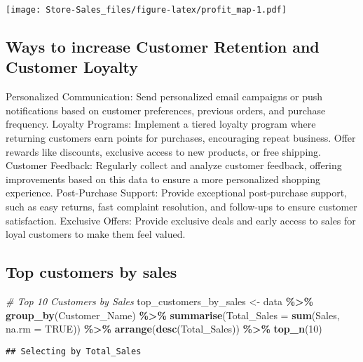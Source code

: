 \documentclass[
]{article}
\newenvironment{Shaded}{\begin{snugshade}}{\end{snugshade}}
\newcommand{\AttributeTok}[1]{\textcolor[rgb]{0.13,0.29,0.53}{#1}}
\newcommand{\CommentTok}[1]{\textcolor[rgb]{0.56,0.35,0.01}{\textit{#1}}}
\newcommand{\ConstantTok}[1]{\textcolor[rgb]{0.56,0.35,0.01}{#1}}
\newcommand{\DecValTok}[1]{\textcolor[rgb]{0.00,0.00,0.81}{#1}}
\newcommand{\FunctionTok}[1]{\textcolor[rgb]{0.13,0.29,0.53}{\textbf{#1}}}
\newcommand{\NormalTok}[1]{#1}
\newcommand{\OtherTok}[1]{\textcolor[rgb]{0.56,0.35,0.01}{#1}}
\newcommand{\SpecialCharTok}[1]{\textcolor[rgb]{0.81,0.36,0.00}{\textbf{#1}}}
\begin{document}
\texttt{[image: Store-Sales\_files/figure-latex/profit\_map-1.pdf]}

\hypertarget{ways-to-increase-customer-retention-and-customer-loyalty}{%
\subsection{Ways to increase Customer Retention and Customer
Loyalty}\label{ways-to-increase-customer-retention-and-customer-loyalty}}

Personalized Communication: Send personalized email campaigns or push
notifications based on customer preferences, previous orders, and
purchase frequency. Loyalty Programs: Implement a tiered loyalty program
where returning customers earn points for purchases, encouraging repeat
business. Offer rewards like discounts, exclusive access to new
products, or free shipping. Customer Feedback: Regularly collect and
analyze customer feedback, offering improvements based on this data to
ensure a more personalized shopping experience. Post-Purchase Support:
Provide exceptional post-purchase support, such as easy returns, fast
complaint resolution, and follow-ups to ensure customer satisfaction.
Exclusive Offers: Provide exclusive deals and early access to sales for
loyal customers to make them feel valued.

\hypertarget{top-customers-by-sales}{%
\subsection{Top customers by sales}\label{top-customers-by-sales}}

\begin{Shaded}
\begin{Highlighting}[]
\CommentTok{\# Top 10 Customers by Sales}
\NormalTok{top\_customers\_by\_sales }\OtherTok{\textless{}{-}}\NormalTok{ data }\SpecialCharTok{\%\textgreater{}\%}
  \FunctionTok{group\_by}\NormalTok{(Customer\_Name) }\SpecialCharTok{\%\textgreater{}\%}
  \FunctionTok{summarise}\NormalTok{(}\AttributeTok{Total\_Sales =} \FunctionTok{sum}\NormalTok{(Sales, }\AttributeTok{na.rm =} \ConstantTok{TRUE}\NormalTok{)) }\SpecialCharTok{\%\textgreater{}\%}
  \FunctionTok{arrange}\NormalTok{(}\FunctionTok{desc}\NormalTok{(Total\_Sales)) }\SpecialCharTok{\%\textgreater{}\%}
  \FunctionTok{top\_n}\NormalTok{(}\DecValTok{10}\NormalTok{)}
\end{Highlighting}
\end{Shaded}

\begin{verbatim}
## Selecting by Total_Sales
\end{verbatim}
\end{document}
